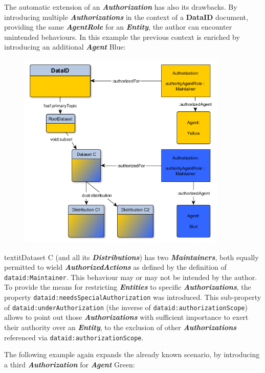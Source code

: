 \documentclass[a4paper,english,twoside,BCOR1.5cm,headsepline,DIV12,appendixprefix,final,12pt]{scrbook}
\newcommand{\dataid}{{\ttfamily\bfseries DataID}\xspace}
\newcommand{\prop}[1]{{{\texttt{#1}}}}
\newcommand{\important}[1]{\textbf{\textit{#1}}}
\begin{document}
The automatic extension of an \important{Authorization} has also its drawbacks. By introducing multiple \important{Authorizations} in the context of a \dataid document, providing the same \important{AgentRole} for an \important{Entity}, the author can encounter unintended behaviours. In this example the previous context is enriched by introducing an additional \important{Agent} Blue:

\begin{figure}[!htbp]
\centering
  \includegraphics[width=10cm]{images/AuthorizationExample2.png}
  \label{fig:dlaxioms}
\end{figure}

textit{Dataset C} (and all its \important{Distributions}) has two \important{Maintainers}, both equally permitted to wield \important{AuthorizedActions} as defined by the definition of \prop{dataid:Maintainer}. This behaviour may or may not be intended by the author. To provide the means for restricting \important{Entities} to specific \important{Authorizations}, the property \prop{dataid:needsSpecialAuthorization} was introduced. This sub-property of \prop{dataid:underAuthorization} (the inverse of \prop{dataid:authorizationScope}) allows to point out those \important{Authorizations} with sufficient importance to exert their authority over an \important{Entity}, to the exclusion of other \important{Authorizations} referenced via \prop{dataid:authorizationScope}.

The following example again expands the already known scenario, by introducing a third \important{Authorization} for \important{Agent} Green:
\end{document}

